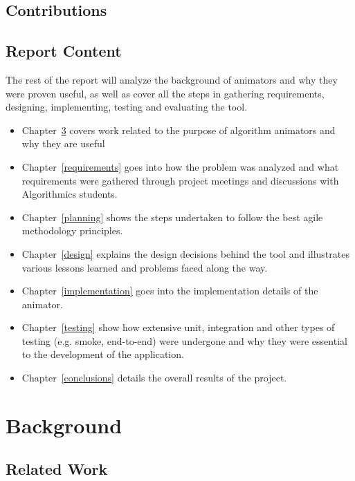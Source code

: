 \documentclass{l4proj}
\begin{document}
\section{Contributions}

\section{Report Content}
The rest of the report will analyze the background of animators and why they were proven useful, as well as cover all the steps in gathering requirements, designing, implementing, testing and evaluating the tool. 

\begin{itemize}
\item Chapter~\ref{background} covers work related to the purpose of algorithm animators and why they are useful 
\item Chapter~\ref{requirements} goes into how the problem was analyzed and what requirements were gathered through
	project meetings and discussions with Algorithmics students.
\item Chapter~\ref{planning} shows the steps undertaken to follow the best agile methodology principles.
\item Chapter~\ref{design} explains the design decisions behind the tool and illustrates various lessons learned and
	problems faced along the way.
\item Chapter~\ref{implementation} goes into the implementation details of the animator.
\item Chapter~\ref{testing} show how extensive unit, integration and other types of testing (e.g. smoke, end-to-end)
	were undergone and why they were essential to the development of the application.
\item Chapter~\ref{conclusions} details the overall results of the project.
\end{itemize}


\chapter{Background}
\label{background}

\section{Related Work}

\end{document}
